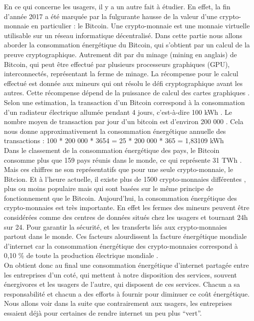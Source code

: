 \documentclass[a4paper,twocolumn,12pt]{article}
\begin{document}
	En ce qui concerne les usagers, il y a un autre fait à étudier. En effet, la fin d'année 2017 a été marquée par la fulgurante hausse de la valeur d’une crypto-monnaie en particulier : le Bitcoin. Une crypto-monnaie est une monnaie virtuelle utilisable sur un réseau informatique décentralisé. Dans cette partie nous allons aborder la consommation énergétique du Bitcoin, qui s’obtient par un calcul de la preuve cryptographique. Autrement dit par du minage (mining en anglais) de Bitcoin, qui peut être effectué par plusieurs processeurs graphiques (GPU), interconnectés, représentant la ferme de minage. La récompense pour le calcul effectué est donnée aux mineurs qui ont résolu le défi cryptographique avant les autres. Cette récompense dépend de la puissance de calcul des cartes graphiques \cite{18}. Selon une estimation, la transaction d’un Bitcoin correspond à la consommation d’un radiateur électrique allumée pendant 4 jours, c'est-à-dire 100 kWh \cite{19}. Le nombre moyen de transaction par jour d’un bitcoin est d'environ 200 000 \cite{20}. Cela nous donne approximativement la consommation énergétique annuelle des transactions : 100 * 200 000 * 3654 = 25 * 200 000 * 365 = 1,83109 kWh \\
	
	Dans le classement de la consommation énergétique des pays, le Bitcoin consomme plus que 159 pays réunis dans le monde, ce qui représente 31 TWh \cite{18}. Mais ces chiffres ne son représentatifs que pour une seule crypto-monnaie, le Bitcion. Et à l’heure actuelle, il existe plus de 1500 crypto-monnaies différentes \cite{21}, plus ou moins populaire mais qui sont basées sur le même principe de fonctionnement que le Bitcoin. Aujourd’hui, la consommation énergétique des crypto-monnaies est très importante. En effet les fermes des mineurs peuvent être considérées comme des centres de données situés chez les usagers et tournant 24h sur 24. Pour garantir la sécurité, et les transferts liés aux crypto-monnaies partout dans le monde. Ces facteurs alourdissent la facture énergétique mondiale d’internet car la consommation énergétique des crypto-monnaies correspond à 0,10 \% de toute la production électrique mondiale \cite{22}.  \\
	
	On obtient donc au final une consommation énergétique d’internet partagée entre les entreprises d’un coté, qui mettent à notre disposition des services, souvent énergivores et les usagers de l’autre, qui disposent de ces services. Chacun a sa responsabilité et chacun a des efforts à fournir pour diminuer ce coût énergétique. Nous allons voir dans la suite que contrairement aux usagers, les entreprises essaient déjà pour certaines de rendre internet un peu plus “vert”.
\end{document}
